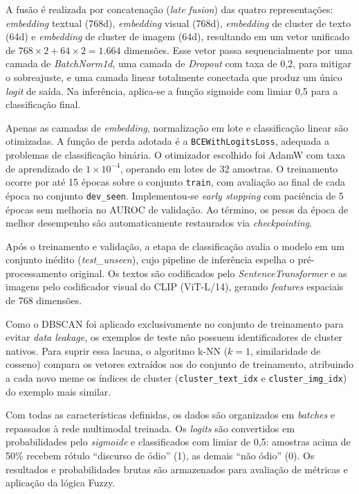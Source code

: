 A fusão é realizada por concatenação
(\textit{late fusion}) das quatro representações: \textit{embedding} textual
(768d), \textit{embedding} visual (768d), \textit{embedding} de cluster de texto
(64d) e \textit{embedding} de cluster de imagem (64d), resultando em um vetor
unificado de $768 \times 2 + 64 \times 2 = 1{.}664$ dimensões. Esse vetor
passa sequencialmente por uma camada de \textit{BatchNorm1d}, uma camada de
\textit{Dropout} com taxa de 0,2, para mitigar o sobreajuste, e uma camada
linear totalmente conectada que produz um único \textit{logit} de saída. Na
inferência, aplica-se a função sigmoide com limiar 0,5 para a classificação final.

Apenas as camadas de \textit{embedding},
normalização em lote e classificação linear são otimizadas. A função de perda
adotada é a \texttt{BCEWithLogitsLoss}, adequada a problemas de classificação
binária. O otimizador escolhido foi AdamW com taxa de aprendizado de
$1 \times 10^{-4}$, operando em lotes de 32 amostras. O treinamento ocorre por
até 15 épocas sobre o conjunto \texttt{train}, com avaliação ao final de cada
época no conjunto \texttt{dev\_seen}. Implementou-se \textit{early stopping} com
paciência de 5 épocas sem melhoria no AUROC de validação. Ao término, os pesos
da época de melhor desempenho são automaticamente restaurados via
\textit{checkpointing}.

Após o treinamento e validação, a etapa de classificação avalia o modelo em um conjunto
inédito (\textit{test\_unseen}), cujo pipeline de inferência espelha o
pré-processamento original. Os textos são codificados pelo \textit{SentenceTransformer} e as imagens pelo codificador visual do CLIP (ViT-L/14),
gerando \textit{features} espaciais de 768 dimensões.

Como o DBSCAN foi aplicado exclusivamente no conjunto de treinamento para evitar
\textit{data leakage}, os exemplos de teste não possuem identificadores de cluster
nativos. Para suprir essa lacuna, o algoritmo k-NN ($k=1$, similaridade de cosseno)
compara os vetores extraídos aos do conjunto de treinamento, atribuindo a cada novo meme
os índices de cluster (\texttt{cluster\_text\_idx} e \texttt{cluster\_img\_idx}) do
exemplo mais similar.

Com todas as características definidas, os dados são organizados em \textit{batches} e
repassados à rede multimodal treinada. Os \textit{logits} são convertidos em probabilidades pelo
\textit{sigmoide} e classificados com limiar de 0,5: amostras acima de 50\% recebem rótulo
``discurso de ódio'' (1), as demais ``não ódio'' (0). Os resultados e probabilidades
brutas são armazenados para avaliação de métricas e aplicação da lógica Fuzzy.

